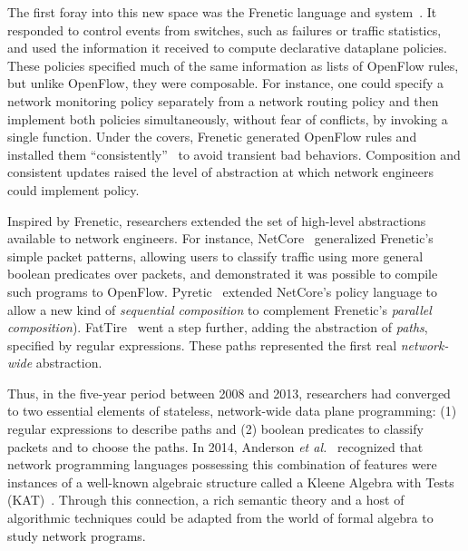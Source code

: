 \documentclass[10pt]{sigalternate052015}
\begin{document}
The first foray into this new space was the Frenetic language and system~\cite{frenetic}.  It responded to control
events from switches, such as failures or traffic statistics, and used
the information it received to compute declarative dataplane
policies.  These policies specified much of the same information as
lists of OpenFlow rules, but unlike OpenFlow, they were composable.  For
instance, one could specify a network monitoring policy separately
from a network routing policy and then implement both policies
simultaneously, without fear of conflicts, by invoking a single
function.  Under the covers, Frenetic 
generated OpenFlow rules and installed them
``consistently''~\cite{consistent-updates} to avoid transient bad
behaviors.  Composition and consistent updates
raised the level of abstraction at which
network engineers could implement policy.

Inspired by Frenetic, researchers extended the set of
high-level abstractions available to network engineers.  For instance,
NetCore~\cite{netcore} generalized Frenetic's
simple packet patterns, allowing users to classify traffic
using more general boolean predicates over packets, and demonstrated
it was possible to compile
such programs to OpenFlow.
Pyretic~\cite{pyretic} extended NetCore's policy language to allow a
new kind of \emph{sequential composition} to complement Frenetic's
\emph{parallel composition}).  FatTire~\cite{fattire} went a step
further, adding the
abstraction of \emph{paths}, specified by regular expressions.
These paths represented the first real \emph{network-wide}
abstraction.

Thus, in the five-year period between 2008 and 2013,
researchers had converged to two essential elements of stateless,
network-wide data
plane programming:  (1) regular expressions to describe paths and (2)
boolean predicates to classify packets and to choose the paths.  In 2014, Anderson \emph{et al.}~\cite{netkat}
recognized that network programming languages possessing this
combination of features were instances of a well-known algebraic
structure called a Kleene Algebra with Tests
(KAT)~\cite{kat}.  Through this connection, a rich semantic
theory and a host of algorithmic techniques could be adapted from the
world of formal algebra to study network programs.
\end{document}
